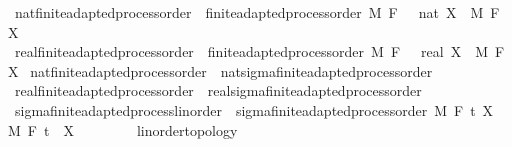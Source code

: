 \begin{isabellebody}
\isanewline
{}\isamarkupfalse%
\ nat{\isacharunderscore}{\kern0pt}finite{\isacharunderscore}{\kern0pt}adapted{\isacharunderscore}{\kern0pt}process{\isacharunderscore}{\kern0pt}order\ {\isacharequal}{\kern0pt}\ finite{\isacharunderscore}{\kern0pt}adapted{\isacharunderscore}{\kern0pt}process{\isacharunderscore}{\kern0pt}order\ M\ F\ {\isachardoublequoteopen}{}\ {\isacharcolon}{\kern0pt}{\isacharcolon}{\kern0pt}\ nat{\isachardoublequoteclose}\ X\ \ M\ F\ X\isanewline
{}\isamarkupfalse%
\ real{\isacharunderscore}{\kern0pt}finite{\isacharunderscore}{\kern0pt}adapted{\isacharunderscore}{\kern0pt}process{\isacharunderscore}{\kern0pt}order\ {\isacharequal}{\kern0pt}\ finite{\isacharunderscore}{\kern0pt}adapted{\isacharunderscore}{\kern0pt}process{\isacharunderscore}{\kern0pt}order\ M\ F\ {\isachardoublequoteopen}{}\ {\isacharcolon}{\kern0pt}{\isacharcolon}{\kern0pt}\ real{\isachardoublequoteclose}\ X\ \ M\ F\ X\isanewline
\isanewline
{}\isamarkupfalse%
\ nat{\isacharunderscore}{\kern0pt}finite{\isacharunderscore}{\kern0pt}adapted{\isacharunderscore}{\kern0pt}process{\isacharunderscore}{\kern0pt}order\ {\isasymsubseteq}\ nat{\isacharunderscore}{\kern0pt}sigma{\isacharunderscore}{\kern0pt}finite{\isacharunderscore}{\kern0pt}adapted{\isacharunderscore}{\kern0pt}process{\isacharunderscore}{\kern0pt}order%
\isadelimproof
\ %
\endisadelimproof
%
\isatagproof
\isacommand{{\isachardot}{\kern0pt}{\isachardot}{\kern0pt}}\isamarkupfalse%
%
\endisatagproof
{\isafoldproof}%
%
\isadelimproof
%
\endisadelimproof
\isanewline
{}\isamarkupfalse%
\ real{\isacharunderscore}{\kern0pt}finite{\isacharunderscore}{\kern0pt}adapted{\isacharunderscore}{\kern0pt}process{\isacharunderscore}{\kern0pt}order\ {\isasymsubseteq}\ real{\isacharunderscore}{\kern0pt}sigma{\isacharunderscore}{\kern0pt}finite{\isacharunderscore}{\kern0pt}adapted{\isacharunderscore}{\kern0pt}process{\isacharunderscore}{\kern0pt}order%
\isadelimproof
\ %
\endisadelimproof
%
\isatagproof
\isacommand{{\isachardot}{\kern0pt}{\isachardot}{\kern0pt}}\isamarkupfalse%
%
\endisatagproof
{\isafoldproof}%
%
\isadelimproof
%
\endisadelimproof
\isanewline
\isanewline
\isanewline
\isanewline
{}\isamarkupfalse%
\ sigma{\isacharunderscore}{\kern0pt}finite{\isacharunderscore}{\kern0pt}adapted{\isacharunderscore}{\kern0pt}process{\isacharunderscore}{\kern0pt}linorder\ {\isacharequal}{\kern0pt}\ sigma{\isacharunderscore}{\kern0pt}finite{\isacharunderscore}{\kern0pt}adapted{\isacharunderscore}{\kern0pt}process{\isacharunderscore}{\kern0pt}order\ M\ F\ t\ X\ \ M\ F\ t\ \ X\ {\isacharcolon}{\kern0pt}{\isacharcolon}{\kern0pt}\ {\isachardoublequoteopen}{\isacharunderscore}{\kern0pt}\ \ {\isasymRightarrow}\ {\isacharunderscore}{\kern0pt}\ {\isasymRightarrow}\ {\isacharunderscore}{\kern0pt}\ {\isacharcolon}{\kern0pt}{\isacharcolon}{\kern0pt}\ {\isacharbraceleft}{\kern0pt}linorder{\isacharunderscore}{\kern0pt}topology{\isacharbraceright}{\kern0pt}{\isachardoublequoteclose}\isanewline

\end{isabellebody}
